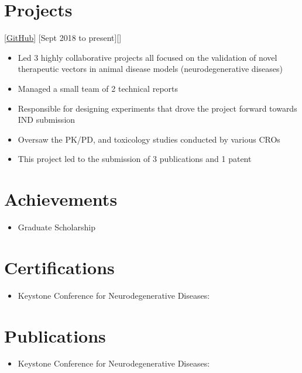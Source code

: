 \documentclass{article}
\begin{document}
    \section{Projects}

    [\href{https://www.linkedin.com/in/mayank-aggarwal-14301b168/}{GitHub}]
    [Sept 2018 to present][]

    \begin{itemize}
        \item Led 3 highly collaborative projects all focused on the validation of novel therapeutic vectors in animal disease models (neurodegenerative diseases)
        \item Managed a small team of 2 technical reports
        \item Responsible for designing experiments that drove the project forward towards IND submission
        \item Oversaw the PK/PD, and toxicology studies conducted by various CROs
        \item This project led to the submission of 3 publications and 1 patent
    \end{itemize}

    \section{Achievements}
    \begin{itemize}
        \item Graduate Scholarship
    \end{itemize}

    \section{Certifications}

    \begin{itemize}
        \item Keystone Conference for Neurodegenerative Diseases:
    \end{itemize}


    \section{Publications}

    \begin{itemize}
        \item Keystone Conference for Neurodegenerative Diseases:
    \end{itemize}
\end{document}
